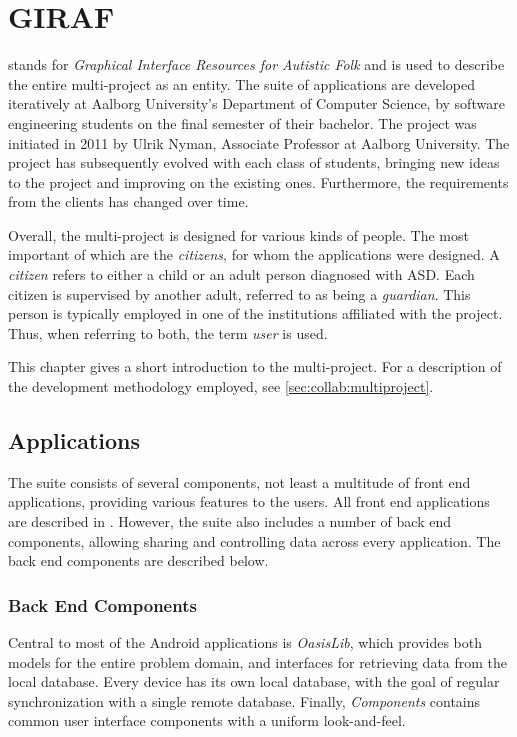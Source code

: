 \chapter{GIRAF}\label{chap:giraf}
\giraf  stands for \textit{Graphical Interface Resources for Autistic Folk} and is used to describe the entire multi-project as an entity.
The suite of \giraf applications are developed iteratively at Aalborg University's Department of Computer Science, by software engineering students on the final semester of their bachelor.
The project was initiated in 2011 by Ulrik Nyman, Associate Professor at Aalborg University.
The project has subsequently evolved with each class of students, bringing new ideas to the project and improving on the existing ones.
Furthermore, the requirements from the clients has changed over time.

Overall, the multi-project is designed for various kinds of people.
The most important of which are the \textit{citizens}, for whom the applications were designed.
A \textit{citizen} refers to either a child or an adult person diagnosed with ASD.
Each citizen is supervised by another adult, referred to as being a \textit{guardian}.
This person is typically employed in one of the institutions affiliated with the \giraf project.
Thus, when referring to both, the term \textit{user} is used.

This chapter gives a short introduction to the \giraf multi-project.
For a description of the development methodology employed, see \cref{sec:collab:multiproject}.

\section{\giraf Applications}\label{sec:giraf:applications}
The \giraf suite consists of several components, not least a multitude of front end applications, providing various features to the users. 
All front end applications are described in . 
However, the suite also includes a number of back end components, allowing sharing and controlling data across every application. 
The back end components are described below.

\subsection{Back End Components}
\label{sec:giraf:applications:backend}
Central to most of the Android applications is \textit{OasisLib}, which provides both models for the entire problem domain, and interfaces for retrieving data from the local database.
Every device has its own local database, with the goal of regular synchronization with a single remote database. 
Finally, \textit{\giraf Components} contains common user interface components with a uniform look-and-feel. 


